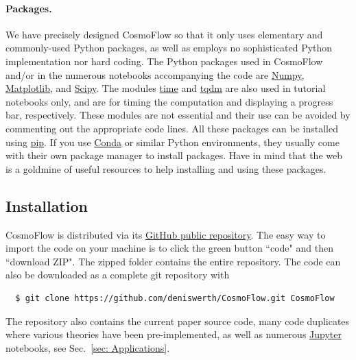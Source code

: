 \documentclass[11pt]{article}
\numberwithin{equation}{section} %
\begin{document}
\paragraph{Packages.} We have precisely designed \textsf{CosmoFlow} so that it only uses elementary and commonly-used Python packages, as well as employs no sophisticated Python implementation nor hard coding. The Python packages used in \textsf{CosmoFlow} and/or in the numerous notebooks accompanying the code are \href{https://numpy.org/}{\textsf{Numpy}}, \href{https://matplotlib.org/}{\textsf{Matplotlib}}, and \href{https://scipy.org/}{\textsf{Scipy}}. The modules \href{https://docs.python.org/3/library/time.html}{\textsf{time}} and \href{https://tqdm.github.io/}{\textsf{tqdm}} are also used in tutorial notebooks only, and are for timing the computation and displaying a progress bar, respectively. These modules are not essential and their use can be avoided by commenting out the appropriate code lines. All these packages can be installed using \href{https://pip.pypa.io/en/stable/}{\textsf{pip}}. If you use \href{https://docs.conda.io/en/latest/}{\textsf{Conda}} or similar Python environments, they usually come with their own package manager to install packages. Have in mind that the web is a goldmine of useful resources to help installing and using these packages.


\subsection{Installation}

\textsf{CosmoFlow} is distributed via its \href{https://github.com/deniswerth/CosmoFlow/tree/main}{GitHub public repository}. The easy way to import the code on your machine is to click the green button ``code" and then ``download ZIP". The zipped folder contains the entire repository. The code can also be downloaded as a complete git repository with
\begin{eBox}
\begin{verbatim}
  $ git clone https://github.com/deniswerth/CosmoFlow.git CosmoFlow
\end{verbatim}
\end{eBox}
The repository also contains the current paper source code, many code duplicates where various theories have been pre-implemented, as well as numerous \href{https://jupyter.org/}{\textsf{Jupyter}} notebooks, see Sec.~\ref{sec: Applications}.

\end{document}
